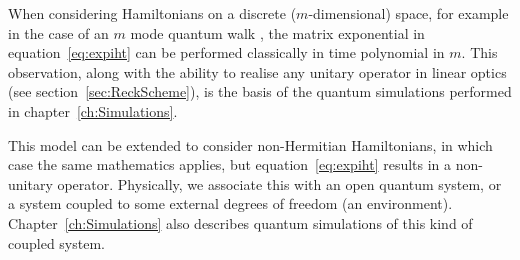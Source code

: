 When considering Hamiltonians on a discrete (\(m\)-dimensional) space, for
example in the case of an \(m\) mode quantum walk \cite{walks-peruzzo}, the
matrix exponential in equation~\ref{eq:expiht} can be performed classically in
time polynomial in \(m\). This observation, along with the ability to realise
any unitary operator in linear optics (see section~\ref{sec:ReckScheme}), is the
basis of the quantum simulations performed in chapter~\ref{ch:Simulations}.

This model can be extended to consider non-Hermitian Hamiltonians, in which
case the same mathematics applies, but equation~\ref{eq:expiht} results in a 
non-unitary operator. Physically, we associate this with an open quantum system,
or a system coupled to some external degrees of freedom (an environment).
Chapter~\ref{ch:Simulations} also describes quantum simulations of this kind of
coupled system.

